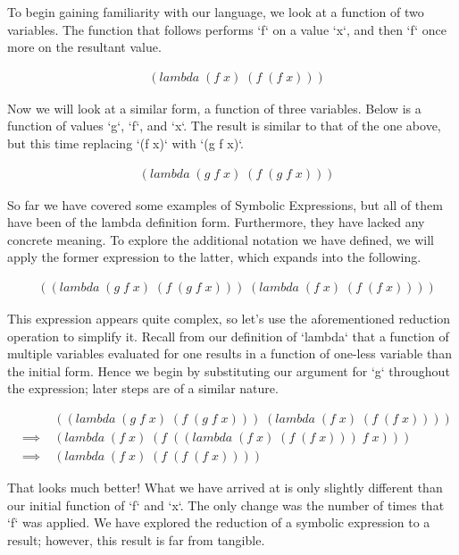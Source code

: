 \documentclass[11pt]{article}
\begin{document}
To begin gaining familiarity with our language, we look at a function of two variables. The function that follows performs `f` on a value `x`, and then `f` once more on the resultant value.

\begin{align*}
& (lambda \; (f \; x) \; (f \; (f \; x)))
\end{align*}

Now we will look at a similar form, a function of three variables. Below is a function of values `g`, `f`, and `x`. The result is similar to that of the one above, but this time replacing `(f x)` with `(g f x)`.

\begin{align*}
& (lambda \; (g \; f \; x) \; (f \; (g \; f \; x)))
\end{align*}

So far we have covered some examples of Symbolic Expressions, but all of them have been of the lambda definition form. Furthermore, they have lacked any concrete meaning. To explore the additional notation we have defined, we will apply the former expression to the latter, which expands into the following.

\begin{align*}
& ((lambda \; (g \; f \; x) \; (f \; (g \; f \; x))) \; (lambda \; (f \; x) \; (f \; (f \; x))))
\end{align*}

This expression appears quite complex, so let's use the aforementioned reduction operation to simplify it. Recall from our definition of `lambda` that a function of multiple variables evaluated for one results in a function of one-less variable than the initial form. Hence we begin by substituting our argument for `g` throughout the expression; later steps are of a similar nature.

\begin{align*}
& &((lambda \; (g \; f \; x) \; (f \; (g \; f \; x))) \; (lambda \; (f \; x) \; (f \; (f \; x))))
\\& \implies \; &(lambda \; (f \; x) \; (f \; ((lambda \; (f \; x) \; (f \; (f \; x))) \; f \; x)))
\\& \implies \; &(lambda \; (f \; x) \; (f \; (f \; (f \; x))))
\end{align*}

That looks much better! What we have arrived at is only slightly different than our initial function of `f` and `x`. The only change was the number of times that `f` was applied. We have explored the reduction of a symbolic expression to a result; however, this result is far from tangible.
\end{document}
